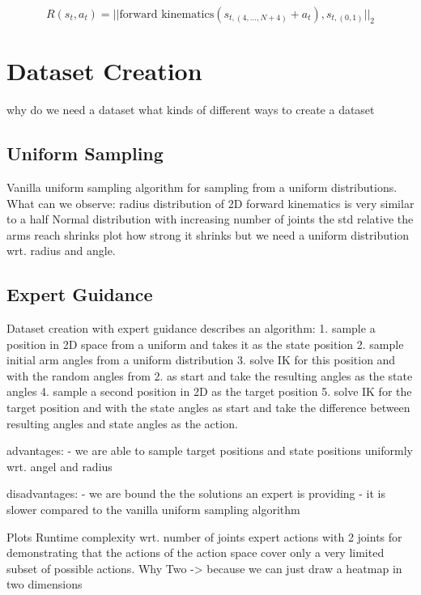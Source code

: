\begin{equation}\label{eqn:Rewardfunction}
    R(s_t, a_t) = ||\text{forward kinematics}(s_{t, (4, \ldots, N + 4)}  + a_t), s_{t, (0 ,1)}||_2
\end{equation}

\section{Dataset Creation}

why do we need a dataset
what kinds of different ways to create a dataset

\subsection{Uniform Sampling}

Vanilla uniform sampling algorithm for sampling from a uniform distributions.
What can we observe:
    radius distribution of 2D forward kinematics is very similar to a half Normal distribution
    with increasing number of joints the std relative the arms reach shrinks
    plot how strong it shrinks
    but we need a uniform distribution wrt. radius and angle. 

\subsection{Expert Guidance}

Dataset creation with expert guidance describes an algorithm:
    1. sample a position in 2D space from a uniform and takes it as the state position
    2. sample initial arm angles from a uniform distribution
    3. solve IK for this position and with the random angles from 2. as start and take the resulting angles as the state angles
    4. sample a second position in 2D as the target position
    5. solve IK for the target position and with the state angles as start and take the difference between resulting angles and state angles as the action.

advantages:
    - we are able to sample target positions and state positions uniformly wrt. angel and radius

disadvantages:
    - we are bound the the solutions an expert is providing
    - it is slower compared to the vanilla uniform sampling algorithm

Plots
    Runtime complexity wrt. number of joints
    expert actions with 2 joints for demonstrating that the actions of the action space cover only a very limited subset of possible actions. Why Two -> because we can just draw a heatmap in two dimensions

